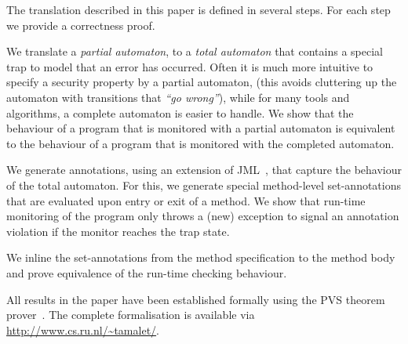 The translation described in this paper is defined in several
steps. For each step we provide a correctness proof.
\begin{inparaenum}
\item We translate a \emph{partial automaton}, to a \emph{total automaton}
that contains a special trap to model that an error has occurred.
Often it is much more intuitive to specify a security property by a partial
automaton, (this avoids cluttering up the automaton with transitions that
\emph{``go wrong''}), while for many tools and algorithms, a complete
automaton is easier to handle.
We show that the behaviour of a program that is monitored with a partial
automaton is equivalent to the behaviour of a program that is monitored with
the completed automaton.
\item We generate annotations, using an extension of JML~\cite{LeavensPCCRCK05},
that capture the behaviour of the total automaton.  For this, we
generate special method-level set-annotations that are evaluated upon
entry or exit of a method.
We show that run-time monitoring of the program only throws a (new) exception
to signal an annotation violation if the monitor reaches the trap state.
\item We inline the set-annotations from the method specification
to the method body and prove equivalence of the run-time checking behaviour.
\end{inparaenum}
All results in the paper have been established formally using
the PVS theorem prover~\cite{OwreRRSS96}. The complete formalisation
is available via \url{http://www.cs.ru.nl/~tamalet/}.

